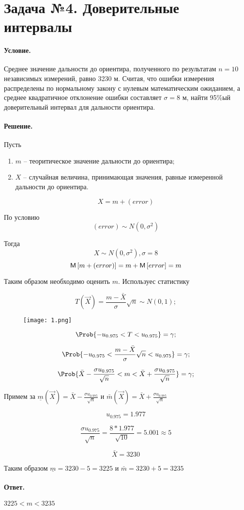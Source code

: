 
\section{Задача №4. Доверительные интервалы}

\paragraph{Условие.} Среднее значение дальности до ориентира, полученного по результатам $n = 10$ независимых измерений, равно 3230 м. Считая, что ошибки измерения распределены по нормальному закону с нулевым математическим ожиданием, а среднее квадратичное отклонение ошибки составляет $\sigma=8$ м, найти 95\%ый доверительный интервал для дальности ориентира.
\paragraph{Решение.}
Пусть 
\begin{enumerate}
	\item $m$ -- теоритическое значение дальности до ориентира;
	\item $X$ -- случайная величина, принимающая значения, равные измеренной дальности до ориентира.  
\end{enumerate}

\[
X = m + (error)
\]

По условию
 \[
(error) \sim N(0, \sigma^2) 
\]

Тогда 
\[
X \sim N(0, \sigma^2), \sigma = 8
\]
\[
\mathsf{M}\left[m + (error)\right] = m + \mathsf{M}\left[error\right] = m
\]

Таким образом необходимо оценить $m$.
Используес статистику

\[
T(\vec{X}) = \frac{m - \bar{X}}{\sigma} \sqrt{n} \sim N(0, 1);
\]

\begin{figure}[h!]
	\begin{center}
		\texttt{[image: 1.png]}
	\end{center}
\end{figure}

\[
\Prob \{-u_{0.975} < T < u_{0.975}\} = \gamma;
\]

\[
\Prob \{-u_{0.975} <   \frac{m - \bar{X}}{\sigma} \sqrt{n}  < u_{0.975} \} = \gamma;
\]

\[
\Prob \{ \bar{X} - \frac{\sigma u_{0.975}}{\sqrt{n}}  < m <  \bar{X} + \frac{\sigma u_{0.975}}{\sqrt{n}} \} = \gamma;
\]

Примем за $\underline{m}(\vec{X}) = \bar{X} - \frac{\sigma u_{0.975}}{\sqrt{n}} $ и $\bar{m}(\vec{X}) = \bar{X} +\frac{\sigma u_{0.975}}{\sqrt{n}}$

\[
u_{0.975} = 1.977
\]

\[
\frac{\sigma u_{0.975}}{\sqrt{n}} = \frac{8 * 1.977}{\sqrt{10}} = 5.001 \approx 5
\]

\[
\bar{X} = 3230
\]

Таким образом $\underline{m} = 3230 - 5 = 3225$ и $\bar{m} = 3230 + 5 = 3235$
\paragraph{Ответ.} $3225 < m < 3235$